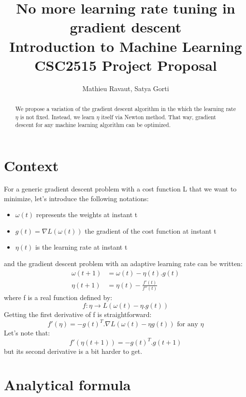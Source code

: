 \documentclass[]{article}
\title{No more learning rate tuning in gradient descent \\
\small{Introduction to Machine Learning CSC2515 Project Proposal}}
\author{Mathieu Ravaut, Satya Gorti}
\begin{document}
\maketitle

\begin{abstract}
	
We propose a variation of the gradient descent algorithm in the which the learning rate $\eta$ is not fixed. Instead, we learn $\eta$ itself via Newton method. That way, gradient descent for any machine learning algorithm can be optimized. 

\end{abstract}

\section{Context}

For a generic gradient descent problem with a cost function L that we want to minimize, let's introduce the following notations:\\
\begin{itemize}
\item $\omega(t)$ represents the weights at instant t
\item $g(t) = \nabla L(\omega(t))$ the gradient of the cost function at instant t
\item $\eta(t)$ is the learning rate at instant t
\end{itemize}
and the gradient descent problem with an adaptive learning rate can be written:\\
\begin{align}
\omega(t+1) &= \omega(t) - \eta(t).g(t)\\
\eta(t+1) &= \eta(t) - \frac{f'(t)}{f''(t)}
\end{align}
where f is a real function defined by:\\
$$f: \eta \rightarrow L(\omega(t) - \eta.g(t))$$
Getting the first derivative of f is straightforward:\\
\begin{equation}
f'(\eta) = -g(t)^{T}.\nabla L(\omega(t)-\eta g(t)) \text{ for any $\eta$}
\end{equation}
Let's note that:\\
\begin{equation}
f'(\eta(t+1)) = -g(t)^{T}.g(t+1)
\end{equation}
but its second derivative is a bit harder to get. 

\section{Analytical formula}
\end{document}
